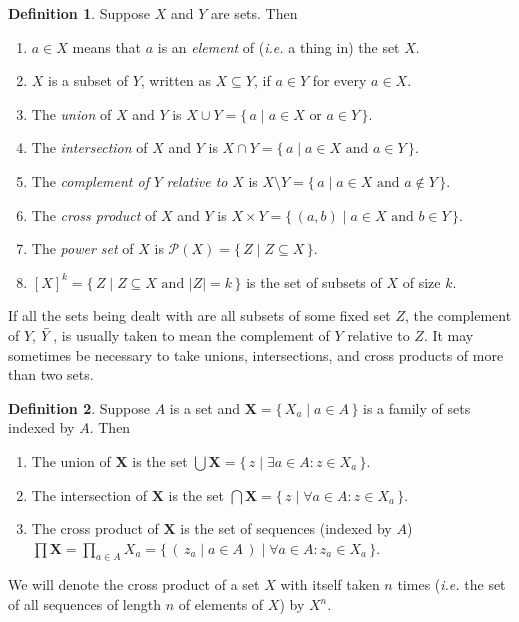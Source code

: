 \documentclass[12pt]{amsbook}
\theoremstyle{plain}
\theoremstyle{definition}
\newtheorem{defn}{Definition}[chapter]
\theoremstyle{remark}
\begin{document}
\begin{defn} \label{d:sed}
Suppose $X$ and $Y$ are sets.  Then 
\begin{enumerate}
\item  $a \in X$ means that $a$ is an {\em element\/} of ({\em i.e.\/} a thing in) the set $X$. \index{$\in$}
\item $X$ is a subset of $Y$,  written as $X \subseteq Y$,  if $a \in Y$ for every $a \in X$. \index{$\subseteq$}
\item The {\em union\/} of $X$ and $Y$ is $X \cup Y = \{\, a \mid a \in X \text{\ or\ } a \in Y \,\}$. \index{$\cup$}
\item The {\em intersection\/} of $X$ and $Y$ is $X \cap Y = \{\, a \mid a \in X \text{\ and\ } a \in Y \,\}$. \index{$\cap$}
\item The {\em complement of\/} $Y$ {\em relative to\/} $X$ is $X \setminus Y = \{\, a \mid a \in X \text{\ and\ } a \notin Y \,\}$.  \index{$\setminus$}
\item The {\em cross product\/} of $X$ and $Y$ is $X \times Y = \{\, (a,b) \mid a \in X \text{\ and\ } b \in Y \,\}$.  \index{$\times$}
\item The {\em power set\/} of $X$ is $\mathcal{P}(X) = \{\, Z \mid Z \subseteq X \,\}$.   
\item $[X]^k = \{\, Z \mid Z \subseteq X \text{\ and\ } |Z| = k \,\}$ is the set of subsets of $X$ of size $k$. 
\end{enumerate}
\end{defn}

If all the sets being dealt with are all subsets of some fixed set $Z$,  the complement of $Y$,  $\Bar{Y}$,  is usually taken to mean the complement of $Y$ relative to $Z$.  It may sometimes be necessary to take unions,  intersections,  and cross products of more than two sets.

\begin{defn}
Suppose $A$ is a set and $\mathbf{X} = \{\, X_a \mid a \in A \,\}$ is a family of sets indexed by $A$.  Then 
\begin{enumerate}
\item The union of $\mathbf{X}$ is the set $\bigcup \mathbf{X} = \{\, z \mid \exists a \in A \colon z \in X_a \,\}$.
\item The intersection of $\mathbf{X}$ is the set $\bigcap \mathbf{X} = \{\, z \mid \forall a \in A \colon z \in X_a \,\}$. 
\item The cross product of $\mathbf{X}$ is the set of sequences (indexed by $A$) $\prod \mathbf{X} = \prod_{a \in A} X_a = \{\, (\, z_a \mid a \in A \,) \mid \forall a \in A \colon z_a \in X_a \,\}$. \index{$\prod$}
\end{enumerate}
 We will denote the cross product of a set $X$ with itself taken $n$ times ({\em i.e.\/} the set of all sequences of length $n$ of elements of $X$) by $X^n$. 
\end{defn}
\end{document}
